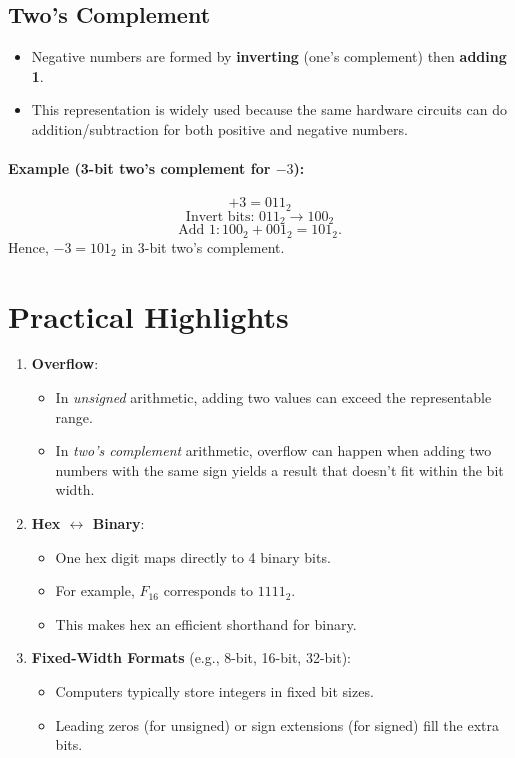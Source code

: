 \documentclass[12pt]{article}
\begin{document}
\subsection{Two's Complement}

\begin{itemize}
  \item Negative numbers are formed by \textbf{inverting} (one's complement) then \textbf{adding 1}.
  \item This representation is widely used because the same hardware circuits can do addition/subtraction for both positive and negative numbers.
\end{itemize}

\paragraph{Example (3-bit two's complement for \(-3\)):}
\[
   +3 = 011_{2}
\]
\[
   \text{Invert bits: } 011_{2} \rightarrow 100_{2}
\]
\[
   \text{Add } 1: 100_{2} + 001_{2} = 101_{2}.
\]
Hence, \(-3 = 101_{2}\) in 3-bit two's complement.

\section{Practical Highlights}

\begin{enumerate}
  \item \textbf{Overflow}: 
    \begin{itemize}
      \item In \textit{unsigned} arithmetic, adding two values can exceed the representable range.
      \item In \textit{two's complement} arithmetic, overflow can happen when adding two numbers with the same sign yields a result that doesn't fit within the bit width.
    \end{itemize}
  \item \textbf{Hex \(\leftrightarrow\) Binary}:
    \begin{itemize}
      \item One hex digit maps directly to 4 binary bits.
      \item For example, \(F_{16}\) corresponds to \(1111_2\).
      \item This makes hex an efficient shorthand for binary.
    \end{itemize}
  \item \textbf{Fixed-Width Formats} (e.g., 8-bit, 16-bit, 32-bit):
    \begin{itemize}
      \item Computers typically store integers in fixed bit sizes.
      \item Leading zeros (for unsigned) or sign extensions (for signed) fill the extra bits.
    \end{itemize}
\end{enumerate}
\end{document}
